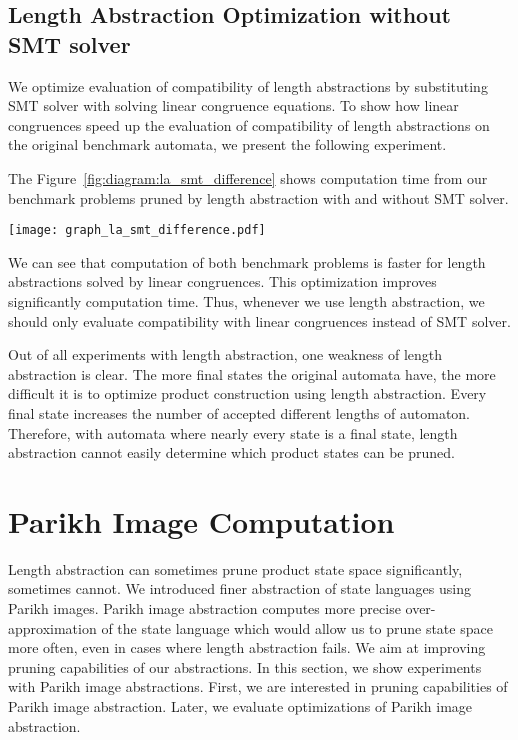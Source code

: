 \subsection{Length Abstraction Optimization without SMT solver}

We optimize evaluation of compatibility of length abstractions by substituting SMT solver with solving linear congruence equations. To show how linear congruences speed up the evaluation of compatibility of length abstractions on the original benchmark automata, we present the following experiment.

The Figure~\ref{fig:diagram:la_smt_difference} shows computation time from our benchmark problems pruned by length abstraction with and without SMT solver.

\begin{figure*}[ht]
	\centering
	\texttt{[image: graph\_la\_smt\_difference.pdf]}
	\caption{Comparison of time consumption of length abstraction evaluated by SMT solver and length abstraction evaluated without SMT solver, combining both benchmark problems. Both axes are in symmetrical logarithmic scale. They show time consumption in seconds: x-axis length abstraction evaluated by SMT solver, y-axis length abstraction evaluated without SMT solver.}
	\label{fig:diagram:la_smt_difference}
\end{figure*}

We can see that computation of both benchmark problems is faster for length abstractions solved by linear congruences. This optimization improves significantly computation time. Thus, whenever we use length abstraction, we should only evaluate compatibility with linear congruences instead of SMT solver.

Out of all experiments with length abstraction, one weakness of length abstraction is clear. The more final states the original automata have, the more difficult it is to optimize product construction using length abstraction. Every final state increases the number of accepted different lengths of automaton. Therefore, with automata where nearly every state is a final state, length abstraction cannot easily determine which product states can be pruned.

\section{Parikh Image Computation}

Length abstraction can sometimes prune product state space significantly, sometimes cannot. We introduced finer abstraction of state languages using Parikh images. Parikh image abstraction computes more precise over-approximation of the state language which would allow us to prune state space more often, even in cases where length abstraction fails. We aim at improving pruning capabilities of our abstractions. In this section, we show experiments with Parikh image abstractions. First, we are interested in pruning capabilities of Parikh image abstraction. Later, we evaluate optimizations of Parikh image abstraction.

